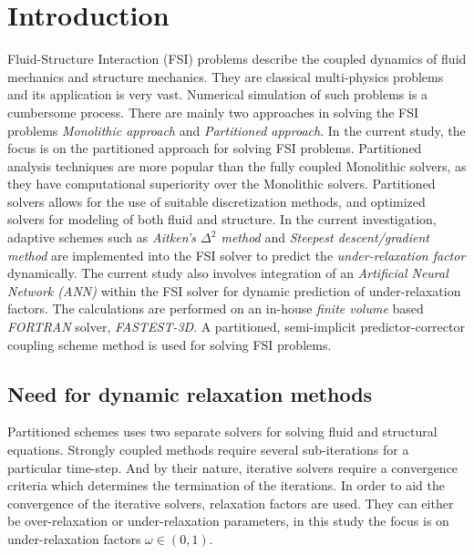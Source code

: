 %
% 


\chapter{Introduction}
Fluid-Structure Interaction (FSI) problems describe the coupled dynamics of fluid mechanics and structure mechanics. They are classical multi-physics problems and its application is very vast. Numerical simulation of such problems is a cumbersome process. There are mainly two approaches in solving the FSI problems \textit{Monolithic approach} and \textit{Partitioned approach}. In the current study, the focus is on the partitioned approach for solving FSI problems. Partitioned analysis techniques are more popular than the fully coupled Monolithic solvers, as they have computational superiority over the Monolithic solvers. Partitioned solvers allows for the use of suitable discretization methods, and optimized solvers for modeling of both fluid and structure. In the current investigation, adaptive schemes such as \textit{Aitken's $\Delta^2$ method} and \textit{Steepest descent/gradient method} are implemented into the FSI solver to predict the \textit{under-relaxation factor} dynamically. The current study also involves integration of an \textit{Artificial Neural Network (ANN)} within the FSI solver for dynamic prediction of under-relaxation factors. The calculations are performed on an in-house \textit{finite volume} based \textit{FORTRAN} solver, \textit{FASTEST-3D}. A partitioned, semi-implicit predictor-corrector coupling scheme method is used for solving FSI problems. 

\section{Need for dynamic relaxation methods}
Partitioned schemes uses two separate solvers for solving fluid and structural equations. Strongly coupled methods require several sub-iterations for a particular time-step. And by their nature, iterative solvers require a convergence criteria which determines the termination of the iterations. In order to aid the convergence of the iterative solvers, relaxation factors are used. They can either be over-relaxation or under-relaxation parameters, in this study the focus is on under-relaxation factors $\omega \in \left(0,1\right)$.
 
